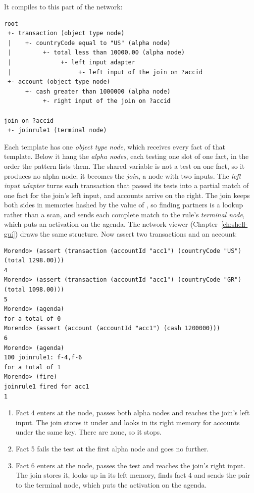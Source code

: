 It compiles to this part of the network:

\begin{lstlisting}[style=shell]
root
 +- transaction (object type node)
 |    +- countryCode equal to "US" (alpha node)
 |         +- total less than 10000.00 (alpha node)
 |              +- left input adapter
 |                   +- left input of the join on ?accid
 +- account (object type node)
      +- cash greater than 1000000 (alpha node)
           +- right input of the join on ?accid

join on ?accid
 +- joinrule1 (terminal node)
\end{lstlisting}

Each template has one \emph{object type node}, which receives every fact
of that template. Below it hang the \emph{alpha nodes}, each testing one
slot of one fact, in the order the pattern lists them. The shared
variable  is not a test on one fact, so it produces no alpha
node; it becomes the \emph{join}, a node with two inputs. The \emph{left
input adapter} turns each transaction that passed its tests into a
partial match of one fact for the join's left input, and accounts arrive
on the right. The join keeps both sides in memories hashed by the value
of , so finding partners is a lookup rather than a scan, and
sends each complete match to the rule's \emph{terminal node}, which puts
an activation on the agenda. The network viewer
(Chapter~\ref{ch:shell-gui}) draws the same structure. Now assert two
transactions and an account:

\begin{lstlisting}[style=shell]
Morendo> (assert (transaction (accountId "acc1") (countryCode "US") (total 1298.00)))
4
Morendo> (assert (transaction (accountId "acc1") (countryCode "GR") (total 1098.00)))
5
Morendo> (agenda)
for a total of 0
Morendo> (assert (account (accountId "acc1") (cash 1200000)))
6
Morendo> (agenda)
100 joinrule1: f-4,f-6
for a total of 1
Morendo> (fire)
joinrule1 fired for acc1
1
\end{lstlisting}

\begin{enumerate}
\item Fact 4 enters at the  node, passes both alpha
  nodes and reaches the join's left input. The join stores it under
   and looks in its right memory for accounts under the same
  key. There are none, so it stops.
\item Fact 5 fails the  test at the first alpha node and
  goes no further.
\item Fact 6 enters at the  node, passes the  test
  and reaches the join's right input. The join stores it, looks up
   in its left memory, finds fact 4 and sends the pair to the
  terminal node, which puts the activation on the agenda.
\end{enumerate}

